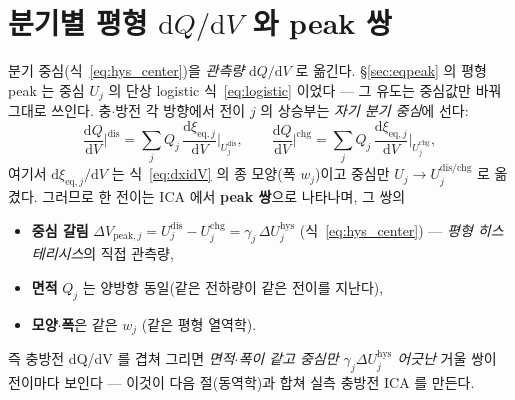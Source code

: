 \documentclass[11pt,a4paper]{article}
\newcommand{\dd}{\mathrm{d}}
\newcommand{\eq}{\mathrm{eq}}
\newcommand{\dis}{\mathrm{dis}}
\newcommand{\chg}{\mathrm{chg}}
\newcommand{\hys}{\mathrm{hys}}
\begin{document}
\section{분기별 평형 $\dd Q/\dd V$ 와 peak 쌍}\label{sec:hys_peak}
분기 중심(식~\eqref{eq:hys_center})을 \emph{관측량} $\dd Q/\dd V$ 로 옮긴다. \S\ref{sec:eqpeak} 의 평형 peak 는
중심 $U_j$ 의 단상 logistic 식~\eqref{eq:logistic} 이었다 — 그 유도는 중심값만 바꿔 그대로 쓰인다. 충$\cdot$방전
각 방향에서 전이 $j$ 의 상승부는 \emph{자기 분기 중심}에 선다:
\begin{equation}
\frac{\dd Q}{\dd V}\Big|^{\dis}=\sum_j Q_j\,\frac{\dd\xi_{\eq,j}}{\dd V}\Big|_{U_j^\dis},\qquad
\frac{\dd Q}{\dd V}\Big|^{\chg}=\sum_j Q_j\,\frac{\dd\xi_{\eq,j}}{\dd V}\Big|_{U_j^\chg},
\label{eq:hys_dQdV}
\end{equation}
여기서 $\dd\xi_{\eq,j}/\dd V$ 는 식~\eqref{eq:dxidV} 의 종 모양(폭 $w_j$)이고 중심만 $U_j\to U_j^{\dis/\chg}$ 로 옮겼다.
그러므로 한 전이는 ICA 에서 \textbf{peak 쌍}으로 나타나며, 그 쌍의
\begin{itemize}[leftmargin=1.4em,itemsep=2pt]
\item \textbf{중심 갈림} $\Delta V_{\mathrm{peak},j}=U_j^\dis-U_j^\chg=\gamma_j\,\Delta U_j^\hys$ (식~\eqref{eq:hys_center}) —
  \emph{평형 히스테리시스}의 직접 관측량,
\item \textbf{면적} $Q_j$ 는 양방향 동일(같은 전하량이 같은 전이를 지난다),
\item \textbf{모양$\cdot$폭}은 같은 $w_j$ (같은 평형 열역학).
\end{itemize}
즉 충방전 dQ/dV 를 겹쳐 그리면 \emph{면적$\cdot$폭이 같고 중심만 $\gamma_j\Delta U_j^\hys$ 어긋난} 거울 쌍이 전이마다 보인다 —
이것이 다음 절(동역학)과 합쳐 실측 충방전 ICA 를 만든다.

\end{document}
